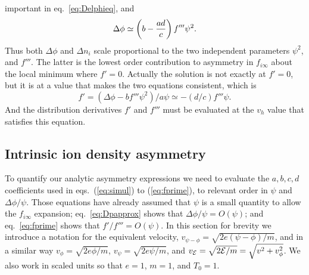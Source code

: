 \documentclass[pre]{revtex4-2}
\def\energy{{\cal E}}
\begin{document}
important in eq.\ \ref{eq:Delphieq}, and
\begin{equation}
  \label{eq:Dpapprox}
  \Delta\phi
\simeq
  \left(b-{ad\over c}\right)f'''\psi^2.
\end{equation}
Thus both $\Delta\phi$ and $\Delta n_i$ scale proportional to the two
independent parameters $\psi^2$, and $f'''$. The latter is the
lowest order contribution to asymmetry in $f_{i\infty}$ about the
local minimum where $f'=0$. Actually the solution is not exactly at
$f'=0$, but it is at a value that makes the two equations consistent,
which is
\begin{equation}
  \label{eq:fprime}
  f'=(\Delta\phi - bf'''\psi^2)/a\psi \simeq
 -(d/c) f'''\psi.
\end{equation}
And the distribution derivatives $f'$ and $f'''$ must be evaluated at
the $v_h$ value that satisfies this equation.

\subsection{Intrinsic ion density asymmetry}


To quantify our analytic asymmetry expressions we need to evaluate the
$a,b,c,d$ coefficients used in eqs.\ (\ref{eq:simul}) to
(\ref{eq:fprime}), to relevant order in $\psi$ and $\Delta\phi/\psi$.
Those equations have already assumed that $\psi$ is a small quantity
to allow the $f_{i\infty}$ expansion; eq.\ \ref{eq:Dpapprox} shows
that $\Delta\phi/\psi=O(\psi)$; and eq.\ \ref{eq:fprime} shows that
$f'/f'''= O(\psi)$. In this section for brevity we introduce a
notation for the equivalent velocity,
$v_{\psi-\phi}=\sqrt{2e(\psi-\phi)/m}$, and in a similar way
$v_\phi=\sqrt{2e\phi/m}$, $v_\psi=\sqrt{2e\psi/m}$, and
$v_\energy=\sqrt{2\energy/m}=\sqrt{v^2+v_\phi^2}$. We also work in
scaled units so that $e=1$, $m=1$, and $T_0=1$.
\end{document}

